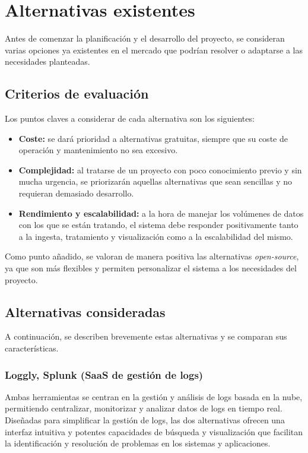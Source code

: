 \section{Alternativas existentes}\label{sec:alternativas}
Antes de comenzar la planificación y el desarrollo del proyecto, se consideran
varias opciones ya existentes en el mercado que podrían resolver o adaptarse a
las necesidades planteadas.

\subsection{Criterios de evaluación}
Los puntos claves a considerar de cada alternativa son los siguientes:

\begin{itemize}
	\item \textbf{Coste:} se dará prioridad a alternativas gratuitas, siempre
		que su coste de operación y mantenimiento no sea excesivo.
	\item \textbf{Complejidad:} al tratarse de un proyecto con poco conocimiento
		previo y sin mucha urgencia, se priorizarán aquellas alternativas que
		sean sencillas y no requieran demasiado desarrollo.
	\item \textbf{Rendimiento y escalabilidad:} a la hora de manejar los
		volúmenes de datos con los que se están tratando, el sistema debe
		responder positivamente tanto a la ingesta, tratamiento y visualización
		como a la escalabilidad del mismo.
\end{itemize}

Como punto añadido, se valoran de manera positiva las alternativas
\textit{open-source}, ya que son más flexibles y permiten personalizar el
sistema a los necesidades del proyecto.

\newpage{}
\subsection{Alternativas consideradas}
A continuación, se describen brevemente estas alternativas y se comparan sus
características.

\subsubsection{Loggly, Splunk (SaaS de gestión de logs)}
Ambas herramientas se centran en la gestión y análisis de logs basada en la nube,
permitiendo centralizar, monitorizar y analizar datos de logs en tiempo real.
Diseñadas para simplificar la gestión de logs, las dos alternativas ofrecen una
interfaz intuitiva y potentes capacidades de búsqueda y visualización que
facilitan la identificación y resolución de problemas en los sistemas y
aplicaciones.

